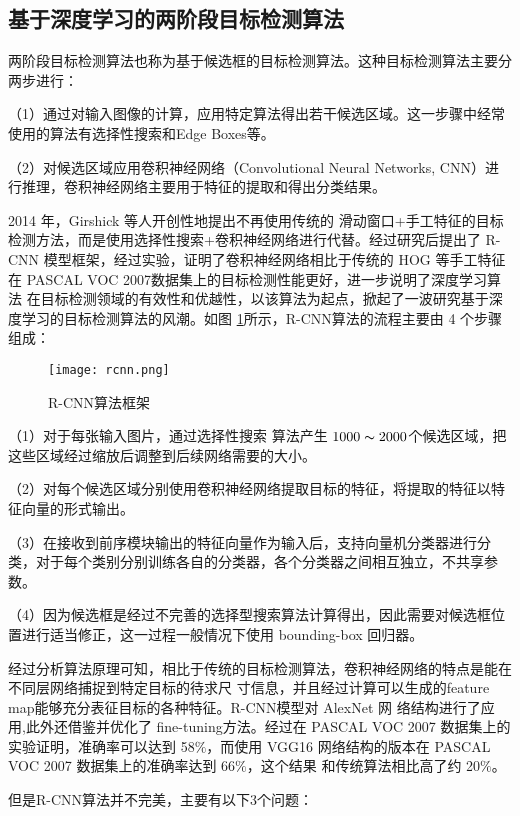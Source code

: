 \subsection{基于深度学习的两阶段目标检测算法}
两阶段目标检测算法也称为基于候选框的目标检测算法。这种目标检测算法主要分两步进行：

（1）通过对输入图像的计算，应用特定算法得出若干候选区域。这一步骤中经常使用的算法有选择性搜索和Edge Boxes等。

（2）对候选区域应用卷积神经网络（Convolutional Neural Networks, CNN）进行推理，卷积神经网络主要用于特征的提取和得出分类结果。

2014 年，Girshick 等人开创性地提出不再使用传统的
滑动窗口+手工特征的目标检测方法，而是使用选择性搜索+卷积神经网络进行代替。经过研究后提出了 R-CNN 模型框架\cite{girshick2014rich}，经过实验，证明了卷积神经网络相比于传统的 HOG
等手工特征在 PASCAL VOC 2007数据集上的目标检测性能更好，进一步说明了深度学习算法
在目标检测领域的有效性和优越性，以该算法为起点，掀起了一波研究基于深度学习的目标检测算法的风潮。如图
\ref{rcnn}所示，R-CNN算法的流程主要由 4 个步骤组成：

\begin{figure}[htbp]
    \centering
    \texttt{[image: rcnn.png]}
    \caption{R-CNN算法框架}
    \label{rcnn}
\end{figure}

（1）对于每张输入图片，通过选择性搜索
算法产生 $1000\thicksim2000$个候选区域，把这些区域经过缩放后调整到后续网络需要的大小。

（2）对每个候选区域分别使用卷积神经网络提取目标的特征，将提取的特征以特征向量的形式输出。

（3）在接收到前序模块输出的特征向量作为输入后，支持向量机分类器进行分类，对于每个类别分别训练各自的分类器，各个分类器之间相互独立，不共享参数。

（4）因为候选框是经过不完善的选择型搜索算法计算得出，因此需要对候选框位置进行适当修正，这一过程一般情况下使用 bounding-box 回归器。

经过分析算法原理可知，相比于传统的目标检测算法，卷积神经网络的特点是能在不同层网络捕捉到特定目标的待求尺
寸信息，并且经过计算可以生成的feature map能够充分表征目标的各种特征。R-CNN模型对 AlexNet 网
络结构进行了应用,此外还借鉴并优化了 fine-tuning方法。经过在 PASCAL VOC 2007 数据集上的实验证明，准确率可以达到 58$\%$，而使用 VGG16 网络结构的版本在 PASCAL VOC 2007 数据集上的准确率达到 66$\%$，这个结果
和传统算法相比高了约 20$\%$。

但是R-CNN算法并不完美，主要有以下3个问题：

